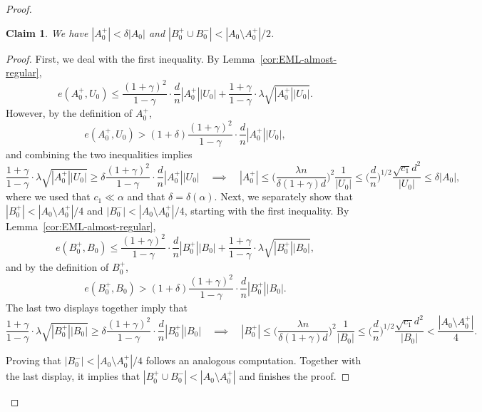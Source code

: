 \documentclass[reqno,a4paper]{amsart}
\newtheorem{claim}[theorem]{Claim}
\theoremstyle{definition}
\begin{document}
\begin{proof}
\begin{claim}\label{cl:A0}
We have $|A^+_0|<\delta|A_0|$ and $|B^+_0\cup B^-_0| < |A_0\setminus A_0^+|/2$. 
\end{claim}
\begin{proof}
First, we deal with the first inequality.
By Lemma~\ref{cor:EML-almost-regular},
\[
    e(A^+_0,U_0)\le \frac{(1+\gamma)^2}{1-\gamma}\cdot\frac{d}{n}|A^+_0||U_0|+\frac{1+\gamma}{1-\gamma}\cdot\lambda \sqrt{|A^+_0||U_0|}.
\]
However, by the definition of $A^+_0$, 
\[
    e(A^+_0,U_0)> \left(1+\delta\right)\frac{(1+\gamma)^2}{1-\gamma}\cdot\frac{d}{n}|A^+_0||U_0|,
\]
and combining the two inequalities implies
\[\frac{1+\gamma}{1-\gamma}\cdot\lambda \sqrt{|A^+_0||U_0|}\ge \delta \frac{(1+\gamma)^2}{1-\gamma}\cdot\frac{d}{n}|A^+_0||U_0|\quad\implies\quad |A^+_0|\le \bigg(\frac{\lambda n}{\delta (1+\gamma)d}\bigg)^2 \frac{1}{|U_0|}\le \bigg(\frac{d}{n}\bigg)^{1/2}\frac{\sqrt{c_1} d^2}{|U_0|}\le \delta |A_0|,\]
where we used that $c_1\ll \alpha$ and that $\delta=\delta(\alpha)$.
Next, we separately show that $|B^+_0| < |A_0\setminus A^+_0|/4$ and $|B^-_0| < |A_0\setminus A^+_0|/4$, starting with the first inequality.
By Lemma~\ref{cor:EML-almost-regular},
\[
    e(B^+_0,B_0)\le \frac{(1+\gamma)^2}{1-\gamma}\cdot\frac{d}{n}|B^+_0||B_0|+\frac{1+\gamma}{1-\gamma}\cdot\lambda \sqrt{|B^+_0||B_0|},
\]
and by the definition of $B^+_0$,
\[
    e(B^+_0,B_0)> \left(1+\delta\right)\frac{(1+\gamma)^2}{1-\gamma}\cdot\frac{d}{n}|B^+_0||B_0|.
\]
The last two displays together imply that
\[\frac{1+\gamma}{1-\gamma}\cdot\lambda \sqrt{|B^+_0||B_0|}\ge \delta \frac{(1+\gamma)^2}{1-\gamma}\cdot\frac{d}{n}|B^+_0||B_0|\quad\implies\quad |B^+_0|\le \bigg(\frac{\lambda n}{\delta (1+\gamma)d}\bigg)^2 \frac{1}{|B_0|}\le \bigg(\frac{d}{n}\bigg)^{1/2}\frac{\sqrt{c_1} d^2}{|B_0|} < \frac{|A_0\setminus A_0^+|}{4}.\]

Proving that $|B^-_0| < |A_0\setminus A^+_0|/4$ follows an analogous computation. Together with the last display, it implies that $|B^+_0\cup B^-_0| < |A_0\setminus A_0^+|$ and finishes the proof.
\end{proof}


\end{proof}
\end{document}

